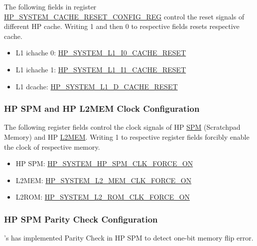 \documentclass[main\_\_EN.tex]{subfiles}
\begin{document}
The following fields in register \hyperref[regdesc:HPSYSTEMCACHERESETCONFIGREG]{HP\_SYSTEM\_CACHE\_RESET\_CONFIG\_REG} control the reset signals of different HP cache. Writing 1 and then 0 to respective fields resets respective cache.
\begin{itemize}
    \item L1 ichache 0: \hyperref[fielddesc:HPSYSTEML1I0CACHERESET]{HP\_SYSTEM\_L1\_I0\_CACHE\_RESET}
    \item L1 ichache 1: \hyperref[fielddesc:HPSYSTEML1I1CACHERESET]{HP\_SYSTEM\_L1\_I1\_CACHE\_RESET}
    \item L1 dcache: \hyperref[fielddesc:HPSYSTEML1DCACHERESET]{HP\_SYSTEM\_L1\_D\_CACHE\_RESET}
\end{itemize}

\subsubsection{HP SPM and HP L2MEM Clock Configuration}

The following register fields control the clock signals of HP \hyperref[mod:sysmem]{SPM} (Scratchpad Memory) and HP \hyperref[mod:sysmem]{L2MEM}. Writing 1 to respective register fields forcibly enable the clock of respective memory.
\begin{itemize}
    \item HP SPM: \hyperref[fielddesc:HPSYSTEMHPSPMCLKFORCEON]{HP\_SYSTEM\_HP\_SPM\_CLK\_FORCE\_ON}
    \item L2MEM: \hyperref[fielddesc:HPSYSTEML2MEMCLKFORCEON]{HP\_SYSTEM\_L2\_MEM\_CLK\_FORCE\_ON}
    \item L2ROM: \hyperref[fielddesc:HPSYSTEML2ROMCLKFORCEON]{HP\_SYSTEM\_L2\_ROM\_CLK\_FORCE\_ON}
\end{itemize}


\subsubsection{HP SPM Parity Check Configuration}

\chipname{}'s has implemented Parity Check in HP SPM to detect one-bit memory flip error.
\end{document}
